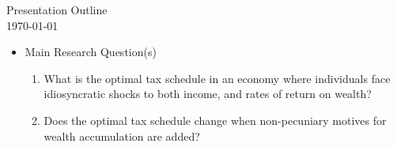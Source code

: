 \documentclass[11pt]{article}
\begin{document}
\begin{flushleft}
    Presentation Outline \\
    \today
\end{flushleft}

    \begin{itemize}
        \item Main Research Question(s)
        \begin{enumerate}
            \item What is the optimal tax schedule in an economy where individuals face idiosyncratic shocks to both income, and rates of return on wealth?
            \item Does the optimal tax schedule change when non-pecuniary motives for wealth accumulation are added?
        \end{enumerate}


\end{itemize}
\end{document}
